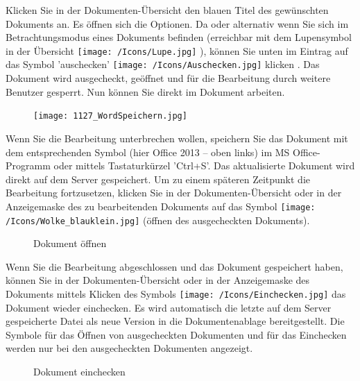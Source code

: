 Klicken Sie in der Dokumenten-Übersicht den blauen Titel des gewünschten Dokuments  an. Es öffnen sich die Optionen. Da oder alternativ wenn Sie sich im Betrachtungsmodus eines Dokuments befinden (erreichbar mit dem Lupensymbol in der Übersicht \texttt{[image: /Icons/Lupe.jpg]} ), können Sie unten im Eintrag auf das Symbol 'auschecken' \texttt{[image: /Icons/Auschecken.jpg]} klicken . Das Dokument wird ausgecheckt, geöffnet und für die Bearbeitung durch weitere Benutzer gesperrt. Nun können Sie direkt im Dokument arbeiten. 

\begin{figure}
\vspace{-15pt}
\texttt{[image: 1127\_WordSpeichern.jpg]}
\end{figure}
Wenn Sie die Bearbeitung unterbrechen wollen, speichern Sie das Dokument mit dem entsprechenden Symbol  (hier Office 2013 -- oben links) im MS Office-Programm oder mittels Tastaturkürzel 'Ctrl+S'. Das aktualisierte Dokument wird direkt auf dem Server gespeichert. Um zu einem späteren Zeitpunkt die Bearbeitung fortzusetzen, klicken Sie in der Dokumenten-Übersicht oder in der Anzeigemaske des zu bearbeitenden Dokuments auf das Symbol \texttt{[image: /Icons/Wolke\_blauklein.jpg]}  (öffnen des ausgecheckten Dokuments).

\begin{figure}[H]
\caption{Dokument öffnen}
\end{figure}

Wenn Sie die Bearbeitung abgeschlossen und das Dokument gespeichert haben, können Sie in der Dokumenten-Übersicht oder in der Anzeigemaske des
Dokuments mittels Klicken des Symbols \texttt{[image: /Icons/Einchecken.jpg]}  das Dokument wieder einchecken. Es wird automatisch die letzte auf dem Server gespeicherte Datei als neue Version in die Dokumentenablage bereitgestellt. Die Symbole für das Öffnen von ausgecheckten Dokumenten und für das Einchecken werden nur bei den ausgecheckten Dokumenten angezeigt.

\begin{figure}[H]
\caption{Dokument einchecken}
\end{figure}

